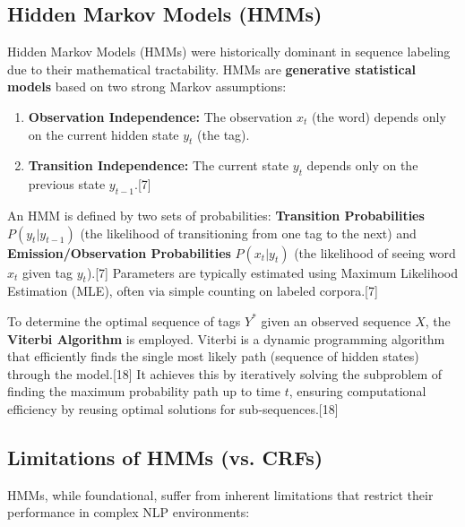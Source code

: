 \documentclass{article}
\begin{document}
\subsection{Hidden Markov Models (HMMs)}

Hidden Markov Models (HMMs) were historically dominant in sequence labeling due to their mathematical tractability. HMMs are \textbf{generative statistical models} based on two strong Markov assumptions:
\begin{enumerate}
    \item \textbf{Observation Independence:} The observation $x_t$ (the word) depends only on the current hidden state $y_t$ (the tag).
    \item \textbf{Transition Independence:} The current state $y_t$ depends only on the previous state $y_{t-1}$.[7]
\end{enumerate}

An HMM is defined by two sets of probabilities: \textbf{Transition Probabilities} $P(y_t|y_{t-1})$ (the likelihood of transitioning from one tag to the next) and \textbf{Emission/Observation Probabilities} $P(x_t|y_t)$ (the likelihood of seeing word $x_t$ given tag $y_t$).[7] Parameters are typically estimated using Maximum Likelihood Estimation (MLE), often via simple counting on labeled corpora.[7]

To determine the optimal sequence of tags $Y^*$ given an observed sequence $X$, the \textbf{Viterbi Algorithm} is employed. Viterbi is a dynamic programming algorithm that efficiently finds the single most likely path (sequence of hidden states) through the model.[18] It achieves this by iteratively solving the subproblem of finding the maximum probability path up to time $t$, ensuring computational efficiency by reusing optimal solutions for sub-sequences.[18]

\subsection{Limitations of HMMs (vs. CRFs)}

HMMs, while foundational, suffer from inherent limitations that restrict their performance in complex NLP environments:
\end{document}
